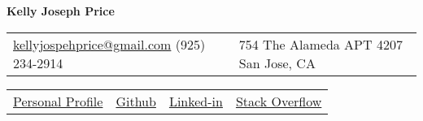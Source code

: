 \documentclass{article}
\begin{document}
\thispagestyle{empty} 

\center \huge{\textbf{Kelly Joseph Price}}
\normalsize

\hspace{.5cm}

\begin{tabularx}{\textwidth}{AX}

    \href{mailto:kellyjosephprice@gmail.com}{kellyjospehprice@gmail.com}\newline
    (925) 234-2914
    
    &

    754 The Alameda APT 4207\newline
    San Jose, CA

\end{tabularx}

\begin{tabularx}{\textwidth}{CCCC}
    \large
    \href{kellyjosephprice.github.io}{Personal Profile}
    &
    \href{https://github.com/kellyjosephprice}{Github}
    &
    \href{https://www.linkedin.com/pub/kelly-price/22/760/a11}{Linked-in}
    &
    \href{https://careers.stackoverflow.com/kellyjosephprice}{Stack Overflow}
    \normalsize
\end{tabularx}
\end{document}
